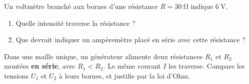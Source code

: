 \documentclass[11pt,a4paper]{article}
\begin{document}
\begin{exo}
Un voltmètre branché aux bornes d'une résistance $R=\qty{30}{\ohm}$ indique $\qty{6}{\volt}$.
\begin{enumerate}[label=\alph*)]
  \item Quelle intensité traverse la résistance ?
  \item Que devrait indiquer un ampèremètre placé en série avec cette résistance ?
\end{enumerate}
\end{exo}

\begin{exo}
Dans une maille unique, un générateur alimente deux résistances $R_1$ et $R_2$ montées \textbf{en
série}, avec $R_1<R_2$. Le même courant $I$ les traverse. Compare les tensions $U_1$ et $U_2$ à leurs
bornes, et justifie par la loi d'Ohm.
\end{exo}
\end{document}
